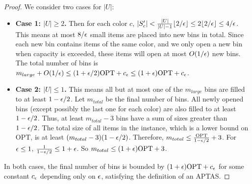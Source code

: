 \begin{proof}
We consider two cases for $|U|$:
\begin{itemize}
    \item \textbf{Case 1: $|U| \geq 2$.} Then for each color $c$, $|S'_c| < \frac{|U|}{|U|-1} \lfloor 2/\epsilon \rfloor \leq 2 \lfloor 2/\epsilon \rfloor \leq 4/\epsilon$. This means at most $8/\epsilon$ small items are placed into new bins in total. Since each new bin contains items of the same color, and we only open a new bin when capacity is exceeded, these items will open at most $O(1/\epsilon)$ new bins. The total number of bins is $m_{large} + O(1/\epsilon) \leq (1 + \epsilon/2)\text{OPT} + c_\epsilon \leq (1 + \epsilon)\text{OPT} + c_\epsilon$.
    \item \textbf{Case 2: $|U| \leq 1$.} This means all but at most one of the $m_{large}$ bins are filled to at least $1 - \epsilon/2$. Let $m_{total}$ be the final number of bins. All newly opened bins (except possibly the last one for each color) are also filled to at least $1 - \epsilon/2$. Thus, at least $m_{total} - 3$ bins have a sum of sizes greater than $1 - \epsilon/2$. The total size of all items in the instance, which is a lower bound on OPT, is at least $(m_{total} - 3)(1 - \epsilon/2)$.
    Therefore, $m_{total} \leq \frac{\text{OPT}}{1 - \epsilon/2} + 3$. For $\epsilon \leq 1$, $\frac{1}{1 - \epsilon/2} \leq 1 + \epsilon$. So $m_{total} \leq (1 + \epsilon)\text{OPT} + 3$.
\end{itemize}
In both cases, the final number of bins is bounded by $(1 + \epsilon)\text{OPT} + c_\epsilon$ for some constant $c_\epsilon$ depending only on $\epsilon$, satisfying the definition of an APTAS.
\end{proof}
